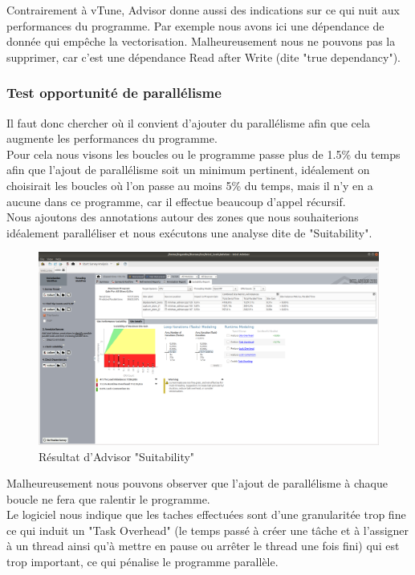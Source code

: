 \documentclass[
 aip,
 jmp,
 amsmath,amssymb,
 reprint
]{revtex4-1}
\begin{document}
Contrairement à vTune, Advisor donne aussi des indications sur ce qui nuit aux performances du programme. Par exemple nous avons ici une dépendance de donnée qui empêche la vectorisation. Malheureusement nous ne pouvons pas la supprimer, car c'est une dépendance Read after Write (dite "true dependancy").

\subsubsection{Test opportunité de parallélisme}

Il faut donc chercher où il convient d'ajouter du parallélisme afin que cela augmente les performances du programme.\\
Pour cela nous visons les boucles ou le programme passe plus de 1.5\% du temps afin que l'ajout de parallélisme soit un minimum pertinent, idéalement on choisirait les boucles où l'on passe au moins 5\% du temps, mais il n'y en a aucune dans ce programme, car il effectue beaucoup d'appel récursif.\\
Nous ajoutons des annotations autour des zones que nous souhaiterions idéalement paralléliser et nous exécutons une analyse dite de "Suitability".

\begin{figure}[H]
  \includegraphics[width=\linewidth, keepaspectratio=true]{suitability.png}
  \caption{Résultat d'Advisor "Suitability"\label{Fig:advisor_suitability}}
\end{figure}

Malheureusement nous pouvons observer que l'ajout de parallélisme à chaque boucle ne fera que ralentir le programme.\\
Le logiciel nous indique que les taches effectuées sont d'une granularitée trop fine ce qui induit un "Task Overhead" (le temps passé à créer une tâche et à l'assigner à un thread ainsi qu'à mettre en pause ou arrêter le thread une fois fini) qui est trop important, ce qui pénalise le programme parallèle.
\end{document}
